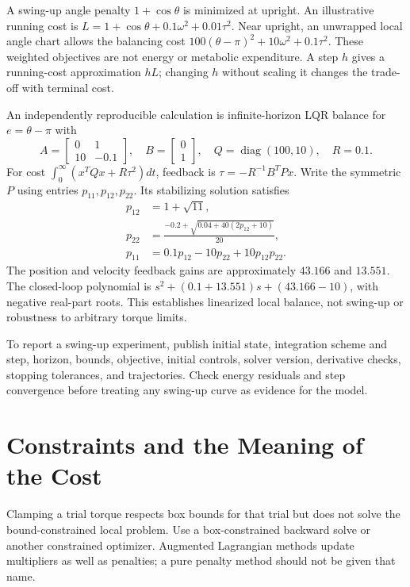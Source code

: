 A swing-up angle penalty $1+\cos\theta$ is minimized at upright. An illustrative
running cost is $L=1+\cos\theta+0.1\omega^2+0.01\tau^2$.
Near upright, an unwrapped local angle chart allows the balancing cost
$100(\theta-\pi)^2+10\omega^2+0.1\tau^2$.
These weighted objectives are not energy or metabolic expenditure. A step $h$
gives a running-cost approximation $hL$; changing $h$ without scaling it changes
the trade-off with terminal cost.

An independently reproducible calculation is infinite-horizon LQR balance for
$e=\theta-\pi$ with
\begin{equation}
A=\begin{bmatrix}0&1\\10&-0.1\end{bmatrix},\quad
B=\begin{bmatrix}0\\1\end{bmatrix},\quad Q=\operatorname{diag}(100,10),\quad R=0.1.
\end{equation}
For cost $\int_0^\infty(x^TQx+R\tau^2)dt$, feedback is
$\tau=-R^{-1}B^TPx$. Write the symmetric $P$ using entries
$p_{11},p_{12},p_{22}$. Its stabilizing solution satisfies
\begin{align}
p_{12}&=1+\sqrt{11},\\
p_{22}&=\frac{-0.2+\sqrt{0.04+40(2p_{12}+10)}}{20},\\
p_{11}&=0.1p_{12}-10p_{22}+10p_{12}p_{22}.
\end{align}
The position and velocity feedback gains are approximately $43.166$ and
$13.551$. The closed-loop polynomial is
$s^2+(0.1+13.551)s+(43.166-10)$, with negative real-part roots. This establishes
linearized local balance, not swing-up or robustness to arbitrary torque limits.

To report a swing-up experiment, publish initial state, integration scheme and
step, horizon, bounds, objective, initial controls, solver version, derivative
checks, stopping tolerances, and trajectories. Check energy residuals and step
convergence before treating any swing-up curve as evidence for the model.

\section{Constraints and the Meaning of the Cost}

Clamping a trial torque respects box bounds for that trial but does not solve
the bound-constrained local problem. Use a box-constrained backward solve or
another constrained optimizer. Augmented Lagrangian methods update multipliers
as well as penalties; a pure penalty method should not be given that name.

